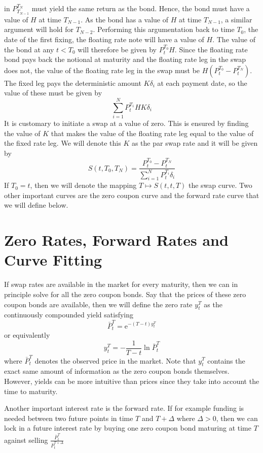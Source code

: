 \documentclass[12pt,twoside]{reedthesis}
\begin{document}
in \(P_{T_{N-1}}^{T_{N}}\) must yield the same return as the bond. Hence, the bond must have a value of \(H\) at time \(T_{N-1}\). As the bond has a value of \(H\) at time \(T_{N-1}\), a similar argument will hold for \(T_{N-2}\). Performing this argumentation back to time \(T_{0}\), the date of the first fixing, the floating rate note will have a value of \(H\). The value of the bond at any \(t<T_{0}\) will therefore be given by \(P_{t}^{T_{0}} H\). Since the floating rate bond pays back the notional at maturity and the floating rate leg in the swap does not, the value of the floating rate leg in the swap must be \(H\left(P_{t}^{T_{0}}-P_{t}^{T_{N}}\right)\). The fixed leg pays the deterministic amount \(K \delta_{i}\) at each payment date, so the value of these must be given by
\[
\sum_{i=1}^{N} P_{t}^{T_{1}} H K \delta_{i}
\]
It is customary to initiate a swap at a value of zero. This is ensured by finding the value of \(K\) that makes the value of the floating rate leg equal to the value of the fixed rate leg. We will denote this \(K\) as the par swap rate and it will be given by
\[
S\left(t, T_{0}, T_{N}\right)=\frac{P_{t}^{T_{0}}-P_{t}^{T_{N}}}{\sum_{i=1}^{N} P_{t}^{T_{i}} \delta_{i}}
\]
If \(T_{0}=t\), then we will denote the mapping \(T \mapsto S(t, t, T)\) the swap curve. Two other important curves are the zero coupon curve and the forward rate curve that we will define below.

\hypertarget{zero-rates-forward-rates-and-curve-fitting}{%
\section{Zero Rates, Forward Rates and Curve Fitting}\label{zero-rates-forward-rates-and-curve-fitting}}

If swap rates are available in the market for every maturity, then we can in principle solve for all the zero coupon bonds. Say that the prices of these zero coupon bonds are available, then we will define the zero rate \(y_{t}^{T}\) as the continuously compounded yield satisfying
\[
\bar{P}_{t}^{T}=\mathrm{e}^{-(T-t) y_{t}^{T}}
\]
or equivalently
\[
y_{t}^{T}=-\frac{1}{T-t} \ln \bar{P}_{t}^{T}
\]
where \(\bar{P}_{t}^{T}\) denotes the observed price in the market. Note that \(y_{t}^{T}\) contains the exact same amount of information as the zero coupon bonds themselves. However, yields can be more intuitive than prices since they take into account the time to maturity.

Another important interest rate is the forward rate. If for example funding is needed between two future points in time \(T\) and \(T+\Delta\) where \(\Delta>0\), then we can lock in a future interest rate by buying one zero coupon bond maturing at time \(T\) against selling \(\frac{\bar{P}_{t}^{T}}{\bar{P}_{t}^{T+\Delta}}\)
\end{document}
